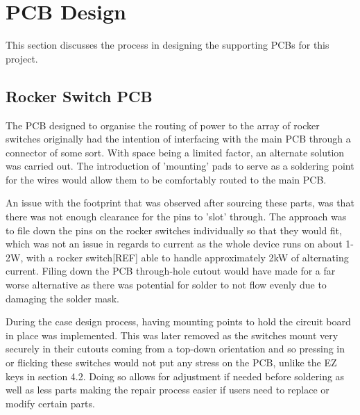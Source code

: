 
\section{PCB Design}
This section discusses the process in designing the supporting PCBs for this project.

\subsection{Rocker Switch PCB}

The PCB designed to organise the routing of power to the array of rocker switches originally had the intention of interfacing with the main PCB through a connector of some sort.
With space being a limited factor, an alternate solution was carried out.
The introduction of 'mounting' pads to serve as a soldering point for the wires would allow them to be comfortably routed to the main PCB.

An issue with the footprint that was observed after sourcing these parts, was that there was not enough clearance for the pins to 'slot' through.
The approach was to file down the pins on the rocker switches individually so that they would fit, which was not an issue in regards to current as the whole device runs on about 1-2W, with a rocker switch[REF] able to handle approximately 2kW of alternating current.
Filing down the PCB through-hole cutout would have made for a far worse alternative as there was potential for solder to not flow evenly due to damaging the solder mask. %

During the case design process, having mounting points to hold the circuit board in place was implemented.
This was later removed as the switches mount very securely in their cutouts coming from a top-down orientation and so pressing in or flicking these switches would not put any stress on the PCB, unlike the EZ keys in section 4.2.
Doing so allows for adjustment if needed before soldering as well as less parts making the repair process easier if users need to replace or modify certain parts.

